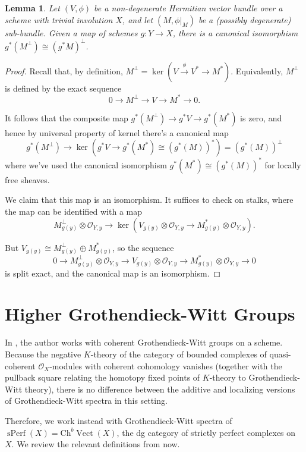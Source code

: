 \documentclass[edeposit,fullpage]{uiucthesis2009}
\newcommand{\mc}{\mathcal}
\DeclareMathOperator{\Vect}{Vect}
\DeclareMathOperator{\sPerf}{sPerf}
\theoremstyle{plain}
\newtheorem{lemma}{Lemma}
\numberwithin{lemma}{section}
\theoremstyle{definition}
\begin{document}
\begin{lemma}\label{lem:perp_pullback}
Let $(V,\phi)$ be a non-degenerate Hermitian vector bundle over a
scheme with trivial involution $X$, and let $(M,\phi|_M)$ be a (possibly degenerate)
sub-bundle. Given a map of schemes $g : Y \rightarrow X$, there is a
canonical isomorphism
$g^*(M^\perp) \cong (g^*M)^\perp$.
\end{lemma}

\begin{proof}
Recall that, by definition, $M^\perp = \ker(V \xrightarrow{\phi} V^*
\rightarrow M^*)$. Equivalently, $M^\perp$
is defined by the exact sequence
\[
0 \rightarrow M^\perp \rightarrow V \rightarrow M^* \rightarrow 0.
\] 

It follows that the composite map $g^*(M^\perp) \rightarrow g^*V
\rightarrow g^*(M^*)$ is zero, and hence by universal property of kernel there's a canonical map
\[
g^*(M^\perp) \rightarrow \ker(g^*V \rightarrow g^*(M^*) \cong (g^*(M))^*) = (g^*(M))^\perp
\]
 where we've used the canonical isomorphism $g^*(M^*) \cong
 (g^*(M))^*$ for locally free sheaves.

We claim that this map is an isomorphism. It suffices to check on
stalks, where the map can be identified with a map 
\[
M^\perp_{g(y)} \otimes \mc O_{Y,y} \rightarrow \ker(V_{g(y)} \otimes
\mc O_{Y,y} \rightarrow M^*_{g(y)} \otimes \mc O_{Y,y}).
\]

But $V_{g(y)} \cong M^\perp_{g(y)} \oplus M^*_{g(y)}$, so the sequence
\[
0 \rightarrow M^\perp_{g(y)} \otimes \mc O_{Y,y}\rightarrow V_{g(y)}
\otimes \mc O_{Y,y} \rightarrow M^*_{g(y)} \otimes \mc O_{Y,y}
\rightarrow 0
\]
is split exact, and the canonical map is an isomorphism. 
\end{proof}


\section{Higher Grothendieck-Witt Groups}\label{sec:Higher_GW}

In \cite{Xie2018ATM}, the author works with coherent Grothendieck-Witt
groups on a scheme. Because the negative $K$-theory of the category of
bounded complexes of quasi-coherent $\mc O_X$-modules with coherent
cohomology vanishes (together with the pullback square relating the
homotopy fixed points of $K$-theory to Grothendieck-Witt theory), there is no difference between the additive and
localizing versions of Grothendieck-Witt spectra in this
setting. 

Therefore, we work instead with Grothendieck-Witt spectra of
$\sPerf(X) = \mathrm{Ch}^b\Vect(X)$, the dg category of strictly
perfect complexes on $X$. We review the relevant definitions from
\cite{Schder} now.
\end{document}
